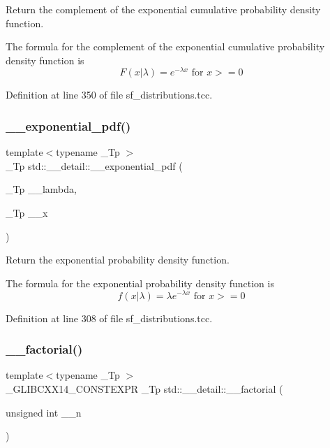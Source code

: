 Return the complement of the exponential cumulative probability density function. 

The formula for the complement of the exponential cumulative probability density function is \[ F(x|\lambda) = e^{-\lambda x} \mbox{ for } x >= 0 \] 

Definition at line 350 of file sf\+\_\+distributions.\+tcc.

\mbox{\label{namespacestd_1_1____detail_add35fd0c4c00f412c0fab7b6018ce2cd}} 
\subsubsection{\texorpdfstring{\+\_\+\+\_\+exponential\+\_\+pdf()}{\_\_exponential\_pdf()}}
{\footnotesize\ttfamily template$<$typename \+\_\+\+Tp $>$ \\
\+\_\+\+Tp std\+::\+\_\+\+\_\+detail\+::\+\_\+\+\_\+exponential\+\_\+pdf (\begin{DoxyParamCaption}\item[{\+\_\+\+Tp}]{\+\_\+\+\_\+lambda,  }\item[{\+\_\+\+Tp}]{\+\_\+\+\_\+x }\end{DoxyParamCaption})}



Return the exponential probability density function. 

The formula for the exponential probability density function is \[ f(x|\lambda) = \lambda e^{-\lambda x} \mbox{ for } x >= 0 \] 

Definition at line 308 of file sf\+\_\+distributions.\+tcc.

\mbox{\label{namespacestd_1_1____detail_a8de5d6069cbef126684be0800f47f8b2}} 
\subsubsection{\texorpdfstring{\+\_\+\+\_\+factorial()}{\_\_factorial()}}
{\footnotesize\ttfamily template$<$typename \+\_\+\+Tp $>$ \\
\+\_\+\+G\+L\+I\+B\+C\+X\+X14\+\_\+\+C\+O\+N\+S\+T\+E\+X\+PR \+\_\+\+Tp std\+::\+\_\+\+\_\+detail\+::\+\_\+\+\_\+factorial (\begin{DoxyParamCaption}\item[{unsigned int}]{\+\_\+\+\_\+n }\end{DoxyParamCaption})}



